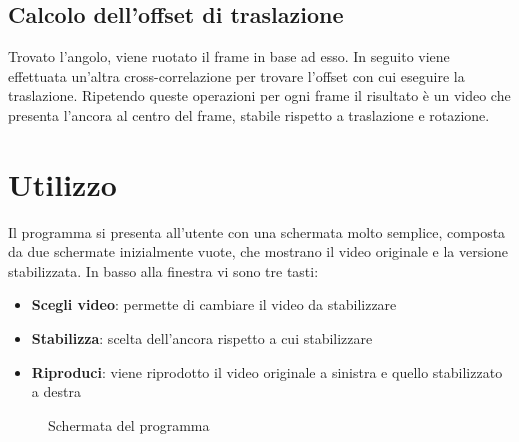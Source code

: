 \documentclass[12pt]{article}
\begin{document}
\subsection{Calcolo dell'offset di traslazione}
Trovato l'angolo, viene ruotato il frame in base ad esso. In seguito viene effettuata un'altra cross-correlazione per trovare l'offset con cui eseguire la traslazione. Ripetendo queste operazioni per ogni frame il risultato è un video che presenta l'ancora al centro del frame, stabile rispetto a traslazione e rotazione.

\clearpage
\section{Utilizzo}
Il programma si presenta all'utente con una schermata molto semplice, composta da due
schermate inizialmente vuote, che mostrano il video originale e la versione stabilizzata.
In basso alla finestra vi sono tre tasti:
\begin{itemize}
	\item \textbf{Scegli video}: permette di cambiare il video da stabilizzare
	\item \textbf{Stabilizza}: scelta dell'ancora rispetto a cui stabilizzare
	\item \textbf{Riproduci}: viene riprodotto il video originale a sinistra e quello stabilizzato a destra
\end{itemize}

\begin{figure}[h!]
	\begin{center}
	  \caption{Schermata del programma}
	\end{center}
\end{figure}
\end{document}
